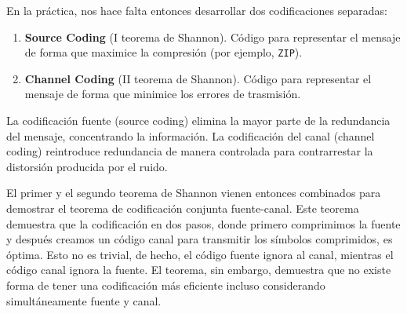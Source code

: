 \documentclass[11pt]{article}
\begin{document}
En la práctica, nos hace falta entonces desarrollar dos codificaciones separadas:
\begin{enumerate}
\item \textbf{Source Coding} (I teorema de Shannon). Código para representar el mensaje de forma que maximice la compresión (por ejemplo, \texttt{ZIP}).
\item \textbf{Channel Coding} (II teorema de Shannon). Código para representar el mensaje de forma que minimice los errores de trasmisión.
\end{enumerate}
La codificación fuente (source coding) elimina la mayor parte de la redundancia del mensaje, concentrando la información. La codificación del canal (channel coding) reintroduce redundancia de manera controlada para contrarrestar la distorsión producida por el ruido.

El primer y el segundo teorema de Shannon vienen entonces combinados para demostrar el teorema de codificación conjunta fuente-canal. Este teorema demuestra que la codificación en dos pasos, donde primero comprimimos la fuente y después creamos un código canal para transmitir los símbolos comprimidos, es óptima. Esto no es trivial, de hecho, el código fuente ignora al canal, mientras el código canal ignora la fuente. El teorema, sin embargo, demuestra que no existe forma de tener una codificación más eficiente incluso considerando simultáneamente fuente y canal.
\end{document}
